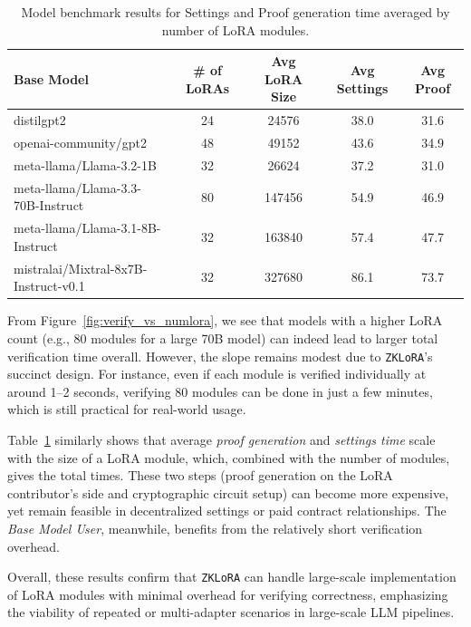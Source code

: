 \documentclass[11pt]{article}
\begin{document}
\begin{table}[h]
\centering
\begin{tabular}{lcccc}
\hline
Base Model & \# of LoRAs & Avg LoRA Size & Avg Settings & Avg Proof \\
\hline
distilgpt2 & 24 & 24576 & 38.0 & 31.6 \\
openai-community/gpt2 & 48 & 49152 & 43.6 & 34.9 \\
meta-llama/Llama-3.2-1B & 32 & 26624 & 37.2 & 31.0 \\
meta-llama/Llama-3.3-70B-Instruct & 80 & 147456 & 54.9 & 46.9 \\
meta-llama/Llama-3.1-8B-Instruct & 32 & 163840 & 57.4 & 47.7 \\
mistralai/Mixtral-8x7B-Instruct-v0.1 & 32 & 327680 & 86.1 & 73.7 \\
\hline
\end{tabular}
\caption{Model benchmark results for Settings and Proof generation time averaged by number of LoRA modules.}\label{tab:settings_proof}
\end{table}

From Figure~\ref{fig:verify_vs_numlora}, we see that models with a higher LoRA count (e.g., 80 modules for a large 70B model) can indeed lead to larger total verification time overall. However, the slope remains modest due to \texttt{ZKLoRA}’s succinct design. For instance, even if each module is verified individually at around 1--2 seconds, verifying 80 modules can be done in just a few minutes, which is still practical for real-world usage.

Table~\ref{tab:settings_proof} similarly shows that average \emph{proof generation} and \emph{settings time} scale with the size of a LoRA module, which, combined with the number of modules, gives the total times. These two steps (proof generation on the LoRA contributor’s side and cryptographic circuit setup) can become more expensive, yet remain feasible in decentralized settings or paid contract relationships. The \emph{Base Model User}, meanwhile, benefits from the relatively short verification overhead.

Overall, these results confirm that \texttt{ZKLoRA} can handle large-scale implementation of LoRA modules with minimal overhead for verifying correctness, emphasizing the viability of repeated or multi-adapter scenarios in large-scale LLM pipelines.
\end{document}
